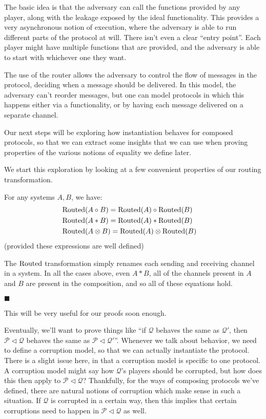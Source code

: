 The basic idea is that the adversary can call the functions
provided by any player, along with the leakage exposed
by the ideal functionality.
This provides a very asynchronous notion of execution,
where the adversary is able to run different parts of the protocol
at will.
There isn't even a clear ``entry point''.
Each player might have multiple functions that are provided,
and the adversary is able to start with whichever one they want.

The use of the router allows the adversary to control the flow
of messages in the protocol, deciding when a message should be delivered.
In this model, the adversary can't reorder messages, but one can
model protocols in which this happens either via a functionality,
or by having each message delivered on a separate channel.

Our next steps will be exploring how instantiation behaves
for composed protocols, so that we can extract some insights
that we can use when proving properties of the various
notions of equality we define later.

We start this exploration by looking at a few convenient properties
of our routing transformation.

\begin{lemma}
  \label{thm:routed}
  For any systems $A, B$, we have:
$$
\begin{aligned}
  &\text{Routed}(A \circ B) = \text{Routed}(A) \circ \text{Routed}(B)\cr
  &\text{Routed}(A * B) = \text{Routed}(A) * \text{Routed}(B)\cr
  &\text{Routed}(A \otimes B) = \text{Routed}(A) \otimes \text{Routed}(B)\cr
\end{aligned}
$$
(provided these expressions are well defined)

 The $\text{Routed}$ transformation simply
renames each sending and receiving channel in a system.
In all the cases above, even $A * B$, all of the channels present
in $A$ and $B$ are present in the composition, and so all
of these equations hold.

$\blacksquare$
\end{lemma}

This will be very useful for our proofs soon enough.

Eventually, we'll want to prove things like ``if $\mathscr{Q}$
behaves the same as $\mathscr{Q}'$, then $\mathscr{P} \lhd \mathscr{Q}$
behaves the same as $\mathscr{P} \lhd \mathscr{Q}'$''.
Whenever we talk about behavior, we need to define a corruption model,
so that we can actually instantiate the protocol.
There is a slight issue here, in that a corruption
model is specific to one protocol.
A corruption model might say how $\mathscr{Q}$'s players should be
corrupted, but how does this then apply to
$\mathscr{P} \lhd \mathscr{Q}$?
Thankfully, for the ways of composing protocols we've defined,
there are natural notions of corruption which make sense in such
a situation.
If $\mathscr{Q}$ is corrupted in a certain way, then this
implies that certain corruptions need to happen in $\mathscr{P} \lhd \mathscr{Q}$ as well.

